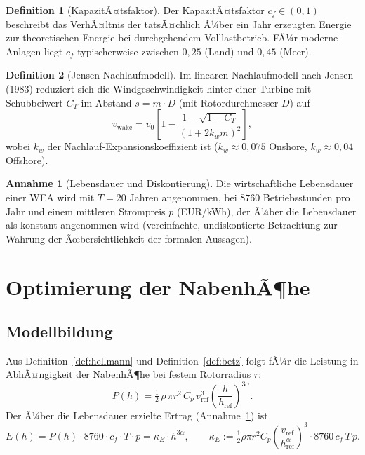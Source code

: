 ﻿\documentclass[a4paper,12pt]{article}
\theoremstyle{definition}
\newtheorem{definition}{Definition}
\newtheorem{annahme}{Annahme}
\begin{document}
\begin{definition}[KapazitÃ¤tsfaktor]
\label{def:cf}
Der KapazitÃ¤tsfaktor $c_f \in (0,1)$ beschreibt das VerhÃ¤ltnis der tatsÃ¤chlich Ã¼ber ein Jahr erzeugten Energie zur theoretischen Energie bei durchgehendem Volllastbetrieb. FÃ¼r moderne Anlagen liegt $c_f$ typischerweise zwischen $0{,}25$ (Land) und $0{,}45$ (Meer).
\end{definition}

\begin{definition}[Jensen-Nachlaufmodell]
\label{def:jensen}
Im linearen Nachlaufmodell nach Jensen (1983) reduziert sich die Windgeschwindigkeit hinter einer Turbine mit Schubbeiwert $C_T$ im Abstand $s = m \cdot D$ (mit Rotordurchmesser $D$) auf
\[
v_{\mathrm{wake}} = v_0 \left[1 - \frac{1-\sqrt{1-C_T}}{(1 + 2 k_w m)^2}\right],
\]
wobei $k_w$ der Nachlauf-Expansionskoeffizient ist ($k_w \approx 0{,}075$ Onshore, $k_w \approx 0{,}04$ Offshore).
\end{definition}

\begin{annahme}[Lebensdauer und Diskontierung]
\label{ann:lebensdauer}
Die wirtschaftliche Lebensdauer einer WEA wird mit $T = 20$ Jahren angenommen, bei $8760$ Betriebsstunden pro Jahr und einem mittleren Strompreis $p$ (EUR/kWh), der Ã¼ber die Lebensdauer als konstant angenommen wird (vereinfachte, undiskontierte Betrachtung zur Wahrung der Ãœbersichtlichkeit der formalen Aussagen).
\end{annahme}

\section{Optimierung der NabenhÃ¶he}

\subsection{Modellbildung}

Aus Definition~\ref{def:hellmann} und Definition~\ref{def:betz} folgt fÃ¼r die Leistung in AbhÃ¤ngigkeit der NabenhÃ¶he bei festem Rotorradius $r$:
\[
P(h) = \tfrac{1}{2}\,\rho\, \pi r^2\, C_p\, v_{\mathrm{ref}}^3 \left(\frac{h}{h_{\mathrm{ref}}}\right)^{3\alpha}.
\]
Der Ã¼ber die Lebensdauer erzielte Ertrag (Annahme~\ref{ann:lebensdauer}) ist
\[
E(h) = P(h) \cdot 8760 \cdot c_f \cdot T \cdot p = \kappa_E \cdot h^{3\alpha}, \qquad \kappa_E := \tfrac{1}{2}\rho \pi r^2 C_p \left(\frac{v_{\mathrm{ref}}}{h_{\mathrm{ref}}^{\alpha}}\right)^3 \cdot 8760\, c_f\, T\, p.
\]
\end{document}
